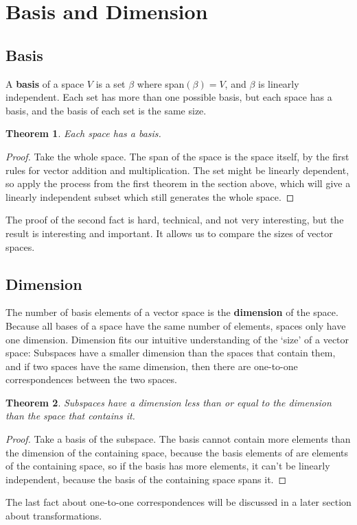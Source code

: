 \documentclass{article}
\newtheorem*{theorem}{Theorem}
\begin{document}
   \section{Basis and Dimension}
       \subsection{Basis}
           A \textbf{basis} of a space $V$ is a set $\beta$ where span$(\beta) = V$, and $\beta$ is linearly independent. Each set has more than one possible basis, but each space has a basis, and the basis of each set is the same size. 
           \begin{theorem}
               Each space has a basis.
           \end{theorem}
           \begin{proof}
               Take the whole space. The span of the space is the space itself, by the first rules for vector addition and multiplication. The set might be linearly dependent, so apply the process from the first theorem in the section above, which will give a linearly independent subset which still generates the whole space.
           \end{proof}
           The proof of the second fact is hard, technical, and not very interesting, but the result is interesting and important. It allows us to compare the sizes of vector spaces.
       \subsection{Dimension}
            The number of basis elements of a vector space is the \textbf{dimension} of the space. Because all bases of a space have the same number of elements, spaces only have one dimension. Dimension fits our intuitive understanding of the `size' of a vector space: Subspaces have a smaller dimension than the spaces that contain them, and if two spaces have the same dimension, then there are one-to-one correspondences between the two spaces. 
            \begin{theorem}
                Subspaces have a dimension less than or equal to the dimension than the space that contains it.
            \end{theorem}
            \begin{proof}
                Take a basis of the subspace. The basis cannot contain more elements than the dimension of the containing space, because the basis elements of are elements of the containing space, so if the basis has more elements, it can't be linearly independent, because the basis of the containing space spans it.
            \end{proof}
            The last fact about one-to-one correspondences will be discussed in a later section about transformations.
\end{document}
